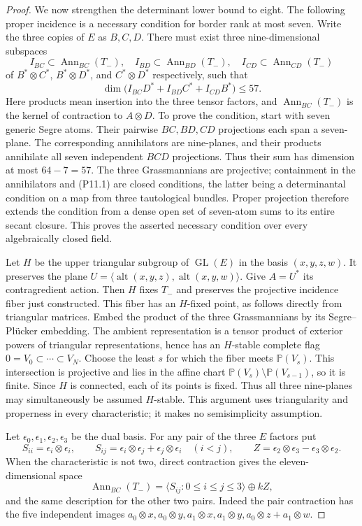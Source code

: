 \begin{proof}
We now strengthen the determinant lower bound to eight.
The following proper incidence is a necessary condition
for border rank at most seven. Write the three copies of
$E$ as $B,C,D$. There must exist three nine-dimensional
subspaces
\[
 I_{BC}\subset\operatorname{Ann}_{BC}(T_-),\quad
 I_{BD}\subset\operatorname{Ann}_{BD}(T_-),\quad
 I_{CD}\subset\operatorname{Ann}_{CD}(T_-)
\]
of $B^*\otimes C^*$, $B^*\otimes D^*$, and
$C^*\otimes D^*$ respectively, such that
\[
 \dim\bigl(I_{BC}D^*+I_{BD}C^*+I_{CD}B^*\bigr)\leq57.
 \tag{P11.1}
\]
Here products mean insertion into the three tensor
factors, and $\operatorname{Ann}_{BC}(T_-)$ is the
kernel of contraction to $A\otimes D$. To prove the
condition, start with seven generic Segre atoms. Their
pairwise $BC,BD,CD$ projections each span a seven-plane.
The corresponding annihilators are nine-planes, and
their products annihilate all seven independent
$BCD$ projections. Thus their sum has dimension at
most $64-7=57$. The three Grassmannians are projective;
containment in the annihilators and (P11.1) are closed
conditions, the latter being a determinantal condition
on a map from three tautological bundles. Proper
projection therefore extends the condition from a
dense open set of seven-atom sums to its entire secant
closure. This proves the asserted necessary condition
over every algebraically closed field.

Let $H$ be the upper triangular subgroup of
$\operatorname{GL}(E)$ in the basis $(x,y,z,w)$.
It preserves the plane
$U=\langle\operatorname{alt}(x,y,z),
\operatorname{alt}(x,y,w)\rangle$. Give $A=U^*$ its
contragredient action. Then $H$ fixes $T_-$ and
preserves the projective incidence fiber just constructed.
This fiber has an $H$-fixed point, as follows directly
from triangular matrices. Embed the product of the
three Grassmannians by its Segre--Pl\"ucker embedding.
The ambient representation is a tensor product of
exterior powers of triangular representations, hence
has an $H$-stable complete flag $0=V_0\subset\cdots
\subset V_N$. Choose the least $s$ for which the fiber
meets $\mathbb P(V_s)$. This intersection is projective
and lies in the affine chart
$\mathbb P(V_s)\setminus\mathbb P(V_{s-1})$, so it is
finite. Since $H$ is connected, each of its points is
fixed. Thus all three nine-planes may simultaneously
be assumed $H$-stable. This argument uses triangularity
and properness in every characteristic; it makes no
semisimplicity assumption.

Let $\epsilon_0,\epsilon_1,\epsilon_2,\epsilon_3$ be
the dual basis. For any pair of the three $E$ factors put
\[
 S_{ii}=\epsilon_i\otimes\epsilon_i,
 \qquad
 S_{ij}=\epsilon_i\otimes\epsilon_j+
         \epsilon_j\otimes\epsilon_i\quad(i<j),
 \qquad
 Z=\epsilon_2\otimes\epsilon_3-
       \epsilon_3\otimes\epsilon_2.
\]
When the characteristic is not two, direct contraction
gives the eleven-dimensional space
\[
 \operatorname{Ann}_{BC}(T_-)
   =\langle S_{ij}:0\leq i\leq j\leq3\rangle\oplus kZ,
 \tag{P11.2}
\]
and the same description for the other two pairs.
Indeed the pair contraction has the five independent
images $a_0\otimes x,a_0\otimes y,a_1\otimes x,
a_1\otimes y,a_0\otimes z+a_1\otimes w$.


\end{proof}
